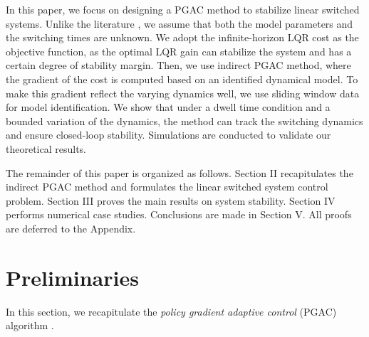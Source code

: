 \documentclass[letterpaper, 10 pt, conference]{ieeeconf}  %
\begin{document}
  

In this paper, we focus on designing a PGAC method to stabilize linear switched systems. Unlike the literature \cite{sun2005switched}, we assume that both the model parameters and the switching times are unknown. We adopt the infinite-horizon LQR cost as the objective function, as the optimal LQR gain can stabilize the system and has a certain degree of stability margin. Then, we use indirect PGAC method, where the gradient of the cost is computed based on an identified dynamical model. To make this gradient reflect the varying dynamics well, we use sliding window data for model identification. We show that under a dwell time condition and a bounded variation of the dynamics, the method can track the switching dynamics and ensure closed-loop stability. 
Simulations are conducted to validate our theoretical results.

The remainder of this paper is organized as follows. Section II recapitulates the indirect PGAC method and formulates the linear switched system control problem. Section III proves the main results on system stability. Section IV performs numerical case studies. Conclusions are made in Section V. All proofs are deferred to the Appendix.

\section{Preliminaries}
In this section, we recapitulate the \textit{policy gradient adaptive control} (PGAC) algorithm \cite{zhao2025policy}.  
\end{document}
